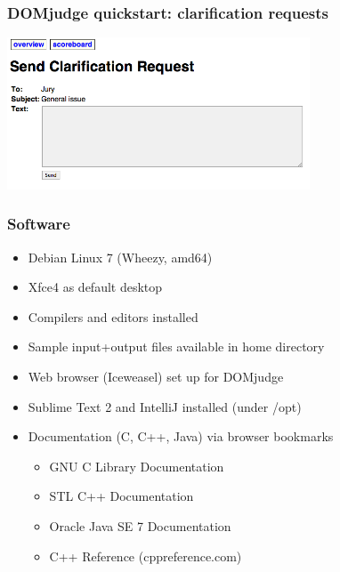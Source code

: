 \documentclass[t]{beamer}
\begin{document}
\begin{frame}
	\frametitle{DOMjudge quickstart: clarification requests}
	\includegraphics[width=90mm]{clarreq.png}
\end{frame}
\begin{frame}
	\frametitle{Software}
	\begin{itemize}
	\item Debian Linux 7 (Wheezy, amd64)
	\end{itemize}
	\begin{itemize}
		\item Xfce4 as default desktop
		\item Compilers and editors installed
		\item Sample input+output files available in home directory
		\item Web browser (Iceweasel) set up for DOMjudge
		\item Sublime Text 2 and IntelliJ installed (under /opt)
	\item Documentation (C, C++, Java) via browser bookmarks
		\begin{itemize}
			\item GNU C Library Documentation
			\item STL C++ Documentation
			\item Oracle Java SE 7 Documentation
			\item C++ Reference (cppreference.com)
		\end{itemize}
	\end{itemize}
\end{frame}
\end{document}

